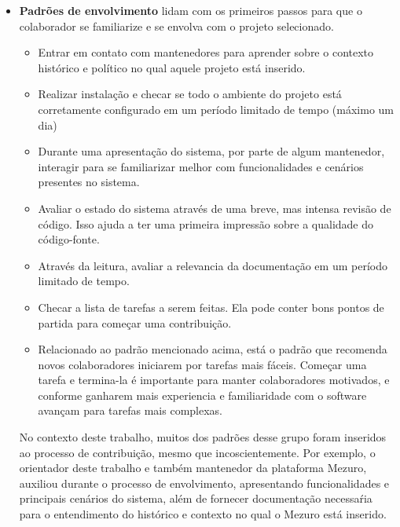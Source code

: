\begin{itemize}
\item \textbf{Padrões de envolvimento} lidam com os primeiros passos para que o colaborador se familiarize e se envolva com o projeto selecionado.
	\begin{itemize}
	\item Entrar em contato com mantenedores para aprender sobre o contexto histórico e político no qual aquele projeto está inserido.
	\item Realizar instalação e checar se todo o ambiente do projeto está corretamente configurado em um período limitado de tempo (máximo um dia)
	\item Durante uma apresentação do sistema,  por parte de algum mantenedor, interagir para se familiarizar melhor com funcionalidades e cenários presentes no sistema.
	\item Avaliar o estado do sistema através de uma breve, mas intensa revisão de código. Isso ajuda a ter uma primeira impressão sobre a qualidade do código-fonte.
	\item Através da leitura, avaliar a relevancia da documentação em um período limitado de tempo.
	\item Checar a lista de tarefas a serem feitas. Ela pode conter bons pontos de partida para começar uma contribuição.
	\item Relacionado ao padrão mencionado acima, está o padrão que recomenda novos colaboradores iniciarem por tarefas mais fáceis. Começar uma tarefa e termina-la é importante para manter colaboradores motivados, e conforme ganharem mais experiencia e familiaridade com o software avançam para tarefas mais complexas.
	\end{itemize}
	No contexto deste trabalho, muitos dos padrões desse grupo foram inseridos ao processo de contribuição, mesmo que incoscientemente. Por exemplo, o orientador deste trabalho e também mantenedor da plataforma Mezuro, auxiliou durante o processo de envolvimento, apresentando funcionalidades e principais cenários do sistema, além de fornecer documentação necessaŕia para o entendimento do histórico e contexto no qual o Mezuro está inserido.
	

\end{itemize}
